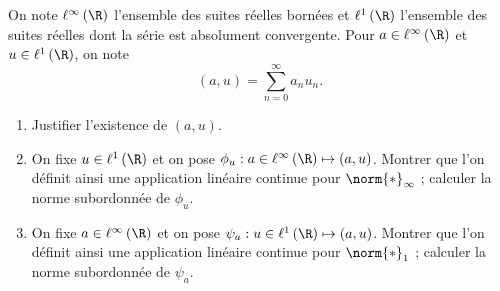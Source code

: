 \begin{enonce}
\begin{exercise}[ID={RMS123 E589 Mines PSI},subtitle={},tags={}]
On note $\ell^\infty\left( \R \right)$ l'ensemble des suites réelles bornées et $\ell^1\left( \R \right)$ l'ensemble des suites réelles dont la série est absolument convergente.
Pour $a\in\ell^\infty\left( \R \right)$ et $u\in\ell^1\left( \R \right)$, on note
\begin{equation*}
  \left( a,u \right) = \sum_{n=0}^\infty a_nu_n.
\end{equation*}
\begin{enumerate}
  \item Justifier l'existence de $\left( a,u \right)$.
  \item On fixe $u\in\ell^1\left( \R \right)$ et on pose $\phi_u : a\in\ell^\infty\left( \R \right)\mapsto \left( a,u \right)$.
    Montrer que l'on définit ainsi une application linéaire continue pour $\norm{*}_\infty$ ; calculer la norme subordonnée de $\phi_u$.
  \item On fixe $a\in\ell^\infty\left( \R \right)$ et on pose $\psi_a : u\in\ell^1\left( \R \right)\mapsto \left( a,u \right)$.
    Montrer que l'on définit ainsi une application linéaire continue pour $\norm{*}_1$ ; calculer la norme subordonnée de $\psi_a$.
\end{enumerate}
\end{exercise}
\begin{solution}
\end{solution}
\end{enonce}
